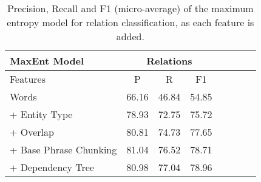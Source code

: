 \documentclass[11pt,a4paper]{article}
\begin{document}
\begin{table}[t]
\small
\begin{center}
\begin{tabular}{ |l||c|c|c|c|c|c|c|  }
 \hline
    MaxEnt Model                 &  \multicolumn{3}{c|}{Relations} \\
\hline
    Features                    & P     & R     & F1    \\
\hline

Words                           & 66.16 & 46.84 & 54.85 \\
+ Entity Type                   & 78.93 & 72.75 & 75.72 \\
+ Overlap                       & 80.81 & 74.73 & 77.65 \\
+ Base Phrase Chunking          & 81.04 & 76.52 & 78.71 \\
+ Dependency Tree               & 80.98 & 77.04 & 78.96 \\

 \hline
\end{tabular}
\end{center}
\caption{Precision, Recall and F1 (micro-average) of the maximum entropy model for relation classification, as each feature is added.}
    \label{table:maxent_relations}
\end{table}


\begin{comment}
{\bf Parse tree}: The path of non-terminals (removing duplicates) connecting the two mentions in the parse tree. We make use syntactic parse trees generated for each sentence using Stanford parser.

\end{comment}

\begin{comment}
For building the baseline relation extraction model, the goal was to classify each gold entity pairs within a sentence with one of the 13 relations types or (no relation). We compute 5 types of features (Words, Entity Type, Overlap, Chunk based, and Dependency tree based features), in line with previous work of \cite{kambhatla2004combining} and \cite{guodong2005exploring}. Additionally we make the following changes to the way we compute some of those features.

[TODO add all this info]
\begin{itemize}
\itemsep0em 
  \item For calculating dependency features, we make use of Stanford dependency parser \cite{chen2014fast}.
  \item Considering our entity annotations were not allowed to overlap, some of the overlap based features were omitted. 
  \item The Base phrase chunks were derived from GENIA's chunk tags. 
\end{itemize}
[TODO add all this info]


Performance with addition of each of those 5 features is presented in Table \ref{table:maxent_relations}
\end{comment}
\end{document}
